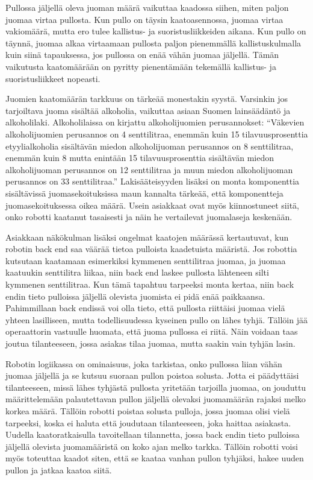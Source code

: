 Pullossa jäljellä oleva juoman määrä vaikuttaa kaadossa siihen, miten paljon juomaa virtaa pullosta. Kun pullo on täysin kaatoasennossa, juomaa virtaa vakiomäärä, mutta ero tulee kallistus- ja suoristusliikkeiden aikana. Kun pullo on täynnä, juomaa alkaa virtaamaan pullosta paljon pienemmällä kallistuskulmalla kuin siinä tapauksessa, jos pullossa on enää vähän juomaa jäljellä. Tämän vaikutusta kaatomäärään on pyritty pienentämään tekemällä kallistus- ja suoristusliikkeet nopeasti.

Juomien kaatomäärän tarkkuus on tärkeää monestakin syystä. Varsinkin jos tarjoiltava juoma sisältää alkoholia, vaikuttaa asiaan Suomen lainsäädäntö ja alkoholilaki. Alkoholilaissa on kirjattu alkoholijuomien perusannokset: ``Väkevien alkoholijuomien perusannos on 4 senttilitraa, enemmän kuin 15 tilavuusprosenttia etyylialkoholia sisältävän miedon alkoholijuoman perusannos on 8 senttilitraa, enemmän kuin 8 mutta enintään 15 tilavuusprosenttia sisältävän miedon alkoholijuoman perusannos on 12 senttilitraa ja muun miedon alkoholijuoman perusannos on 33 senttilitraa.'' \cite{Finlex} Lakisääteisyyden lisäksi on monta komponenttia sisältävissä juomasekoituksissa maun kannalta tärkeää, että komponentteja juomasekoituksessa oikea määrä. Usein asiakkaat ovat myös kiinnostuneet siitä, onko robotti kaatanut tasaisesti ja näin he vertailevat juomalaseja keskenään.

Asiakkaan näkökulman lisäksi ongelmat kaatojen määrässä kertautuvat, kun robotin back end saa väärää tietoa pulloista kaadetuista määristä. Jos robottia kutsutaan kaatamaan esimerkiksi kymmenen senttilitraa juomaa, ja juomaa kaatuukin senttilitra liikaa, niin back end laskee pullosta lähteneen silti kymmenen senttilitraa. Kun tämä tapahtuu tarpeeksi monta kertaa, niin back endin tieto pulloissa jäljellä olevista juomista ei pidä enää paikkaansa. Pahimmillaan back endissä voi olla tieto, että pullosta riittäisi juomaa vielä yhteen lasilliseen, mutta todellisuudessa kyseinen pullo on lähes tyhjä. Tällöin jää operaattorin vastuulle huomata, että juoma pullossa ei riitä. Näin voidaan taas joutua tilanteeseen, jossa asiakas tilaa juomaa, mutta saakin vain tyhjän lasin.

Robotin logiikassa on ominaisuus, joka tarkistaa, onko pullossa liian vähän juomaa jäljellä ja se kutsuu suoraan pullon poistoa solusta. Jotta ei päädyttäisi tilanteeseen, missä lähes tyhjästä pullosta yritetään tarjoilla juomaa, on jouduttu määrittelemään palautettavan pullon jäljellä olevaksi juomamäärän rajaksi melko korkea määrä. Tällöin robotti poistaa solusta pulloja, jossa juomaa olisi vielä tarpeeksi, koska ei haluta että joudutaan tilanteeseen, joka haittaa asiakasta. Uudella kaatoratkaisulla tavoitellaan tilannetta, jossa back endin tieto pulloissa jäljellä olevista juomamääristä on koko ajan melko tarkka. Tällöin robotti voisi myös toteuttaa kaadot siten, että se kaataa vanhan pullon tyhjäksi, hakee uuden pullon ja jatkaa kaatoa siitä.
